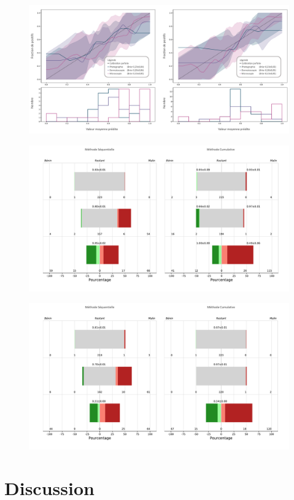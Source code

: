 \begin{figure}[H]
    \centering
    \includegraphics[width=\linewidth]{contents/chapter_7/resources/results_calibration_cumulative_calibrated.pdf}
    \caption{}
    \label{fig:results_calibration_cumulative_calibrated}
\end{figure}\par

\begin{figure}[H]
    \centering
    \includegraphics[width=\linewidth]{contents/chapter_7/resources/results_processus_weighted.pdf}
    \caption{}
    \label{fig:results_processus_weighted}
\end{figure}\par

\begin{figure}[H]
    \centering
    \includegraphics[width=\linewidth]{contents/chapter_7/resources/results_processus_malignant.pdf}
    \caption{}
    \label{fig:results_processus_malignant}
\end{figure}\par

\section{Discussion}